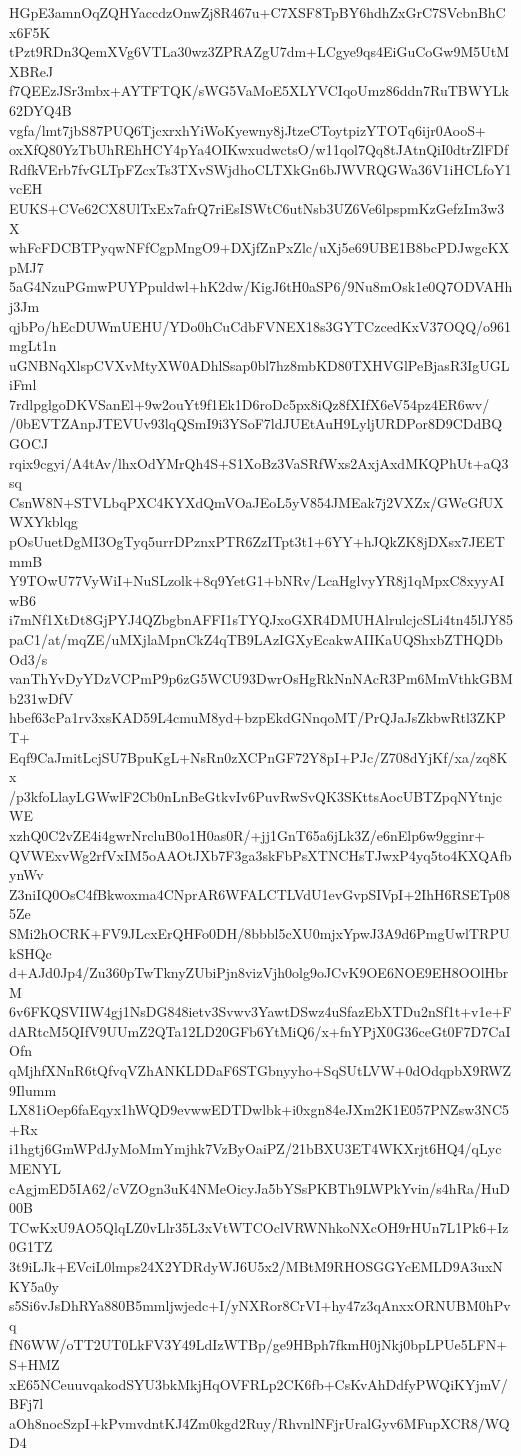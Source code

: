 HGpE3amnOqZQHYaccdzOnwZj8R467u+C7XSF8TpBY6hdhZxGrC7SVcbnBhCx6F5K
tPzt9RDn3QemXVg6VTLa30wz3ZPRAZgU7dm+LCgye9qs4EiGuCoGw9M5UtMXBReJ
f7QEEzJSr3mbx+AYTFTQK/sWG5VaMoE5XLYVCIqoUmz86ddn7RuTBWYLk62DYQ4B
vgfa/lmt7jbS87PUQ6TjcxrxhYiWoKyewny8jJtzeCToytpizYTOTq6ijr0AooS+
oxXfQ80YzTbUhREhHCY4pYa4OIKwxudwctsO/w11qol7Qq8tJAtnQiI0dtrZlFDf
RdfkVErb7fvGLTpFZcxTs3TXvSWjdhoCLTXkGn6bJWVRQGWa36V1iHCLfoY1vcEH
EUKS+CVe62CX8UlTxEx7afrQ7riEsISWtC6utNsb3UZ6Ve6lpspmKzGefzIm3w3X
whFcFDCBTPyqwNFfCgpMngO9+DXjfZnPxZlc/uXj5e69UBE1B8bcPDJwgcKXpMJ7
5aG4NzuPGmwPUYPpuldwl+hK2dw/KigJ6tH0aSP6/9Nu8mOsk1e0Q7ODVAHhj3Jm
qjbPo/hEcDUWmUEHU/YDo0hCuCdbFVNEX18s3GYTCzcedKxV37OQQ/o961mgLt1n
uGNBNqXlspCVXvMtyXW0ADhlSsap0bl7hz8mbKD80TXHVGlPeBjasR3IgUGLiFml
7rdlpglgoDKVSanEl+9w2ouYt9f1Ek1D6roDc5px8iQz8fXIfX6eV54pz4ER6wv/
/0bEVTZAnpJTEVUv93lqQSmI9i3YSoF7ldJUEtAuH9LyljURDPor8D9CDdBQGOCJ
rqix9cgyi/A4tAv/lhxOdYMrQh4S+S1XoBz3VaSRfWxs2AxjAxdMKQPhUt+aQ3sq
CsnW8N+STVLbqPXC4KYXdQmVOaJEoL5yV854JMEak7j2VXZx/GWcGfUXWXYkblqg
pOsUuetDgMI3OgTyq5urrDPznxPTR6ZzITpt3t1+6YY+hJQkZK8jDXsx7JEETmmB
Y9TOwU77VyWiI+NuSLzolk+8q9YetG1+bNRv/LcaHglvyYR8j1qMpxC8xyyAIwB6
i7mNf1XtDt8GjPYJ4QZbgbnAFFI1sTYQJxoGXR4DMUHAlrulcjcSLi4tn45lJY85
paC1/at/mqZE/uMXjlaMpnCkZ4qTB9LAzIGXyEcakwAIIKaUQShxbZTHQDbOd3/s
vanThYvDyYDzVCPmP9p6zG5WCU93DwrOsHgRkNnNAcR3Pm6MmVthkGBMb231wDfV
hbef63cPa1rv3xsKAD59L4cmuM8yd+bzpEkdGNnqoMT/PrQJaJsZkbwRtl3ZKPT+
Eqf9CaJmitLcjSU7BpuKgL+NsRn0zXCPnGF72Y8pI+PJc/Z708dYjKf/xa/zq8Kx
/p3kfoLlayLGWwlF2Cb0nLnBeGtkvIv6PuvRwSvQK3SKttsAocUBTZpqNYtnjcWE
xzhQ0C2vZE4i4gwrNrcluB0o1H0as0R/+jj1GnT65a6jLk3Z/e6nElp6w9gginr+
QVWExvWg2rfVxIM5oAAOtJXb7F3ga3skFbPsXTNCHsTJwxP4yq5to4KXQAfbynWv
Z3niIQ0OsC4fBkwoxma4CNprAR6WFALCTLVdU1evGvpSIVpI+2IhH6RSETp085Ze
SMi2hOCRK+FV9JLcxErQHFo0DH/8bbbl5cXU0mjxYpwJ3A9d6PmgUwlTRPUkSHQc
d+AJd0Jp4/Zu360pTwTknyZUbiPjn8vizVjh0olg9oJCvK9OE6NOE9EH8OOlHbrM
6v6FKQSVIIW4gj1NsDG848ietv3Svwv3YawtDSwz4uSfazEbXTDu2nSf1t+v1e+F
dARtcM5QIfV9UUmZ2QTa12LD20GFb6YtMiQ6/x+fnYPjX0G36ceGt0F7D7CaIOfn
qMjhfXNnR6tQfvqVZhANKLDDaF6STGbnyyho+SqSUtLVW+0dOdqpbX9RWZ9Ilumm
LX81iOep6faEqyx1hWQD9evwwEDTDwlbk+i0xgn84eJXm2K1E057PNZsw3NC5+Rx
i1hgtj6GmWPdJyMoMmYmjhk7VzByOaiPZ/21bBXU3ET4WKXrjt6HQ4/qLycMENYL
cAgjmED5IA62/cVZOgn3uK4NMeOicyJa5bYSsPKBTh9LWPkYvin/s4hRa/HuD00B
TCwKxU9AO5QlqLZ0vLlr35L3xVtWTCOclVRWNhkoNXcOH9rHUn7L1Pk6+Iz0G1TZ
3t9iLJk+EVciL0lmps24X2YDRdyWJ6U5x2/MBtM9RHOSGGYcEMLD9A3uxNKY5a0y
s5Si6vJsDhRYa880B5mmljwjedc+I/yNXRor8CrVI+hy47z3qAnxxORNUBM0hPvq
fN6WW/oTT2UT0LkFV3Y49LdIzWTBp/ge9HBph7fkmH0jNkj0bpLPUe5LFN+S+HMZ
xE65NCeuuvqakodSYU3bkMkjHqOVFRLp2CK6fb+CsKvAhDdfyPWQiKYjmV/BFj7l
aOh8nocSzpI+kPvmvdntKJ4Zm0kgd2Ruy/RhvnlNFjrUralGyv6MFupXCR8/WQD4
